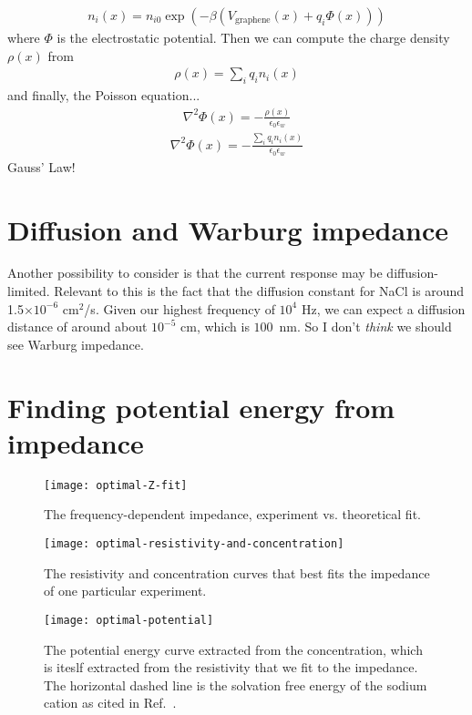 \documentclass[twocolumn]{revtex4-1}
\begin{document}
\begin{align}
  n_i(x) = n_{i0} \exp\left(-\beta \left(V_{\text{graphene}}(x)
                                       + q_i \Phi(x)\right)\right)
\end{align}
where $\Phi$ is the electrostatic potential.  Then we can compute the
charge density $\rho(x)$ from
\begin{align}
  \rho(x) = \sum_i q_i n_i(x)
\end{align}
and finally, the Poisson equation...
\begin{align}
  \nabla^2 \Phi(x) = -\frac{\rho(x)}{\epsilon_0\epsilon_w}
\end{align}
\begin{align}
  \nabla^2 \Phi(x) = -\frac{\sum_i q_i n_i(x)}{\epsilon_0\epsilon_w}
\end{align}
Gauss' Law!


\section{Diffusion and Warburg impedance}

Another possibility to consider is that the current response may be
diffusion-limited.  Relevant to this is the fact that the diffusion
constant for NaCl is around 1.5$\times 10^{-6}$ cm$^2$/s.  Given our
highest frequency of $10^4$ Hz, we can expect a diffusion distance of
around about $10^{-5}$ cm, which is $100$~nm.  So I don't \emph{think}
we should see Warburg impedance.


\clearpage

\section{Finding potential energy from impedance}

\begin{figure}
  \texttt{[image: optimal-Z-fit]}
  \caption{The frequency-dependent impedance, experiment
    vs. theoretical fit.}\label{fig:optimal-Z-fit}
\end{figure}

\begin{figure}
  \texttt{[image: optimal-resistivity-and-concentration]}
  \caption{The resistivity and concentration curves that best fits the
    impedance of one particular
    experiment.}\label{fig:optimal-resistivity-and-concentration}
\end{figure}

\begin{figure}
  \texttt{[image: optimal-potential]}
  \caption{The potential energy curve extracted from the
    concentration, which is iteslf extracted from the resistivity that
    we fit to the impedance.  The horizontal dashed line is the
    solvation free energy of the sodium cation as cited in
    Ref.~\cite{horinek2009rational}.}\label{fig:optimal-potential}
\end{figure}
\end{document}
